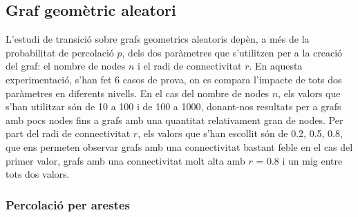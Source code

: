 \documentclass[a4paper]{article}
\begin{document}
	
	\subsection{Graf geomètric aleatori}
	
	L'estudi de transició sobre grafs geometrics aleatoris depèn, a més de la probabilitat de percolació $p$, dels dos paràmetres que s'utilitzen per a la creació del graf: el nombre de nodes $n$ i el radi de connectivitat $r$.
	En aquesta experimentació, s'han fet 6 casos de prova, on es compara l'impacte de tots dos paràmetres en diferents nivells. En el cas del nombre de nodes $n$, els valors que s'han utilitzar són de 10 a 100 i de 100 a 1000,
	donant-nos resultats per a grafs amb pocs nodes fins a grafs amb una quantitat relativament gran de nodes. Per part del radi de connectivitat $r$, els valors que s'han escollit són de 0.2, 0.5, 0.8, que ens permeten observar grafs amb una connectivitat
	bastant feble en el cas del primer valor, grafs amb una connectivitat molt alta amb $r$ = 0.8 i un mig entre tots dos valors.
	
	\subsubsection{Percolació per arestes}
	
\end{document}
